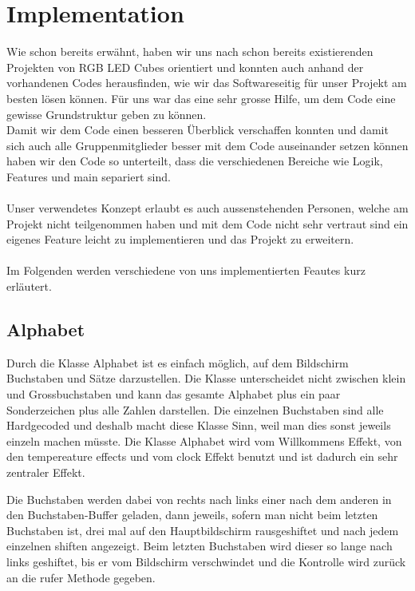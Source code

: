 \documentclass[12pt,a4paper]{article}
\begin{document}
\section{Implementation}

Wie schon bereits erwähnt, haben wir uns nach schon bereits existierenden Projekten von RGB LED Cubes orientiert und konnten
auch anhand der vorhandenen Codes herausfinden, wie wir das Softwareseitig für unser Projekt am besten lösen können.
Für uns war das eine sehr grosse Hilfe, um dem Code eine gewisse Grundstruktur geben zu können. \\
Damit wir dem Code einen besseren Überblick verschaffen konnten und damit sich auch alle Gruppenmitglieder besser mit dem Code
auseinander setzen können haben wir den Code so unterteilt, dass die verschiedenen Bereiche wie Logik, Features und 
main separiert sind. \\\\
Unser verwendetes Konzept erlaubt es auch aussenstehenden Personen, welche am Projekt nicht teilgenommen haben und mit dem Code nicht sehr
vertraut sind ein eigenes Feature leicht zu implementieren und das Projekt zu erweitern. \\\\
Im Folgenden werden verschiedene von uns implementierten Feautes kurz erläutert.

\subsection{Alphabet}

Durch die Klasse Alphabet ist es einfach möglich, auf dem Bildschirm Buchstaben und Sätze darzustellen. Die Klasse unterscheidet nicht zwischen klein und Grossbuchstaben und kann das gesamte Alphabet plus ein paar Sonderzeichen plus alle Zahlen darstellen. Die einzelnen Buchstaben sind alle Hardgecoded und deshalb macht diese Klasse Sinn, weil man dies sonst jeweils einzeln machen müsste. Die Klasse Alphabet wird vom Willkommens Effekt, von den tempereature effects und vom clock Effekt benutzt und ist dadurch ein sehr zentraler Effekt.

Die Buchstaben werden dabei von rechts nach links einer nach dem anderen in den Buchstaben-Buffer geladen, dann jeweils, sofern man nicht beim letzten Buchstaben ist, drei mal auf den Hauptbildschirm rausgeshiftet und nach jedem einzelnen shiften angezeigt. Beim letzten Buchstaben wird dieser so lange nach links geshiftet, bis er vom Bildschirm verschwindet und die Kontrolle wird zurück an die rufer Methode gegeben.
\end{document}

